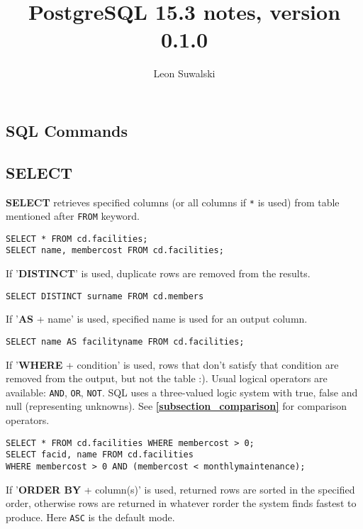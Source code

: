 \documentclass{charun}
\title{PostgreSQL 15.3 notes, version 0.1.0}
\author{Leon Suwalski}
\begin{document}
\begin{multicols*}{2}
\maketitle
\raggedright

\section{SQL Commands}
\subsection{SELECT}
\textbf{SELECT} retrieves specified columns (or all columns if \texttt{*} is used) from table mentioned after \texttt{FROM} keyword.
\begin{verbatim}
SELECT * FROM cd.facilities;
SELECT name, membercost FROM cd.facilities;
\end{verbatim}

If '\textbf{DISTINCT}' is used, duplicate rows are removed from the results.
\begin{verbatim}
SELECT DISTINCT surname FROM cd.members
\end{verbatim}

If '\textbf{AS} + name' is used, specified name is used for an output column.
\begin{verbatim}
SELECT name AS facilityname FROM cd.facilities;
\end{verbatim}

If '\textbf{WHERE} + condition' is used, rows that don't satisfy that condition are removed from the output, but not the table :).
Usual logical operators are available: \texttt{AND}, \texttt{OR}, \texttt{NOT}.
SQL uses a three-valued logic system with true, false and null (representing unknowns).
See \textbf{\ref{subsection_comparison}} for comparison operators.
\begin{verbatim}
SELECT * FROM cd.facilities WHERE membercost > 0;
SELECT facid, name FROM cd.facilities
WHERE membercost > 0 AND (membercost < monthlymaintenance);
\end{verbatim}

If '\textbf{ORDER BY} + column(s)' is used, returned rows are sorted in the specified order, otherwise rows are returned in whatever rorder the system finds fastest to produce.
Here \texttt{ASC} is the default mode.


\end{multicols*}
\end{document}
